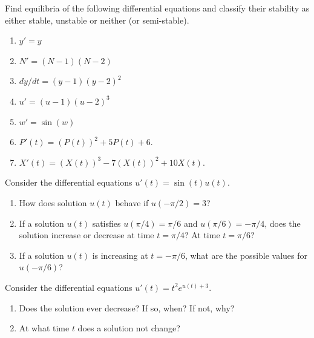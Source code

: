 \documentclass[../main.tex]{subfiles}
\begin{document}
\begin{exercise}
  Find equilibria of the following differential equations and classify their stability as either stable, unstable or neither (or semi-stable).

  \begin{enumerate}
    \item \(y' = y\)
    \item \(N' = (N-1)(N-2)\)
    \item \(dy/dt = (y-1)(y-2)^{2}\)
    \item \(u' = (u-1)(u-2)^{3}\)
    \item \(w' = \sin(w)\)
    \item \(P'(t) = \left(P(t)\right)^{2} + 5P(t) + 6\).
    \item \(X'(t) = \left( X(t) \right)^{3} - 7\left( X(t) \right)^{2} + 10X(t)\).
  \end{enumerate}
\end{exercise}


\begin{exercise}
  Consider the differential equations \(u'(t) = \sin(t) u(t)\).

  \begin{enumerate}
    \item How does solution \(u(t)\) behave if \(u(-\pi/2) = 3\)?
    \item If a solution \(u(t)\) satisfies \(u(\pi/4) = \pi/6\) and \(u(\pi/6) = -\pi/4\), does the solution increase or decrease at time \(t = \pi/4\)? At time \(t = \pi/6\)?
    \item If a solution \(u(t)\) is increasing at \(t = -\pi/6\), what are the possible values for \(u(-\pi/6)\)?
  \end{enumerate}
\end{exercise}


\begin{exercise}
  Consider the differential equations \(u'(t) = t^{2} e^{u(t) + 3}\).    

  \begin{enumerate}
    \item Does the solution ever decrease? If so, when? If not, why?
    \item At what time \(t\) does a solution not change? 
  \end{enumerate}
\end{exercise}
\end{document}
